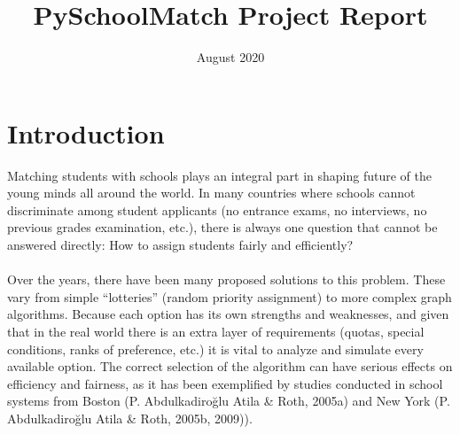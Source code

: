 \documentclass[twocolumn]{article}
\title{Py\-School\-Match Project Report}
\author{
Ankit Srivastav\textsuperscript{1\*}\thanks{\textbf{1} Faculty of Business Administration, Memorial University of Newfoundland, St. John's, NL, CA Email: ankits@mun.ca};\,\thanks

}
\date{August 2020}
\begin{document}
\newcommand{\jref}{CMSC6950\_Final\_Project}
\newcommand{\jhead}{CMSC6950\_Final\_Project}
\newcommand{\jdate}{July 2020}


\twocolumn[
\vspace{-.3in}
\maketitle
\vspace{-3mm}
\begin{abstract}
The school choice problem is formulated as a one\-sided or a two\-sided matching problem. Py\-school\-match aims to solve the problem of matching students with schools according to a pre\-defined set of criteria. It is an open\-source Python package that implements multiple matching algorithms in order to assign students to schools.  It is specifically designed to allocate students to schools by evaluating different settings and algorithms, without the need to adapt or develop a complete solution.

\smallskip
\noindent
\end{abstract}\bigskip]


\section{Introduction}
Matching students with schools plays an integral part in shaping future of the young minds all around the world. In many countries where schools cannot discriminate among student applicants (no entrance exams, no interviews, no previous grades examination, etc.), there is always one
question that cannot be answered directly: How to assign students fairly and efficiently?
\\
\\
Over the years, there have been many proposed solutions to this problem. These vary from simple “lotteries” (random priority assignment) to more complex graph algorithms. Because each option has its own strengths and weaknesses, and given that in the real world there is an extra layer of requirements (quotas, special conditions, ranks of preference, etc.) it is vital to analyze and simulate every available option. The correct selection of the algorithm can have serious effects on efficiency and fairness, as it has been exemplified by studies conducted in school systems from Boston (P. Abdulkadiroğlu Atila \& Roth, 2005a) and New York (P. Abdulkadiroğlu Atila \& Roth, 2005b, 2009)).
\end{document}
